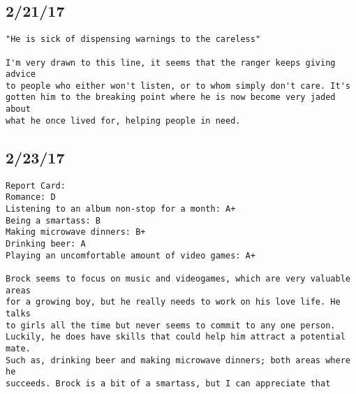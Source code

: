 \documentclass[12pt,letterpaper]{article}
\begin{document}
\subsection*{2/21/17}
\begin{verbatim}
"He is sick of dispensing warnings to the careless"

I'm very drawn to this line, it seems that the ranger keeps giving advice
to people who either won't listen, or to whom simply don't care. It's
gotten him to the breaking point where he is now become very jaded about
what he once lived for, helping people in need.
\end{verbatim}

\subsection*{2/23/17}
\begin{verbatim}
Report Card:
Romance: D
Listening to an album non-stop for a month: A+
Being a smartass: B
Making microwave dinners: B+
Drinking beer: A
Playing an uncomfortable amount of video games: A+

Brock seems to focus on music and videogames, which are very valuable areas
for a growing boy, but he really needs to work on his love life. He talks
to girls all the time but never seems to commit to any one person. 
Luckily, he does have skills that could help him attract a potential mate.
Such as, drinking beer and making microwave dinners; both areas where he 
succeeds. Brock is a bit of a smartass, but I can appreciate that


\end{verbatim}
\end{document}
